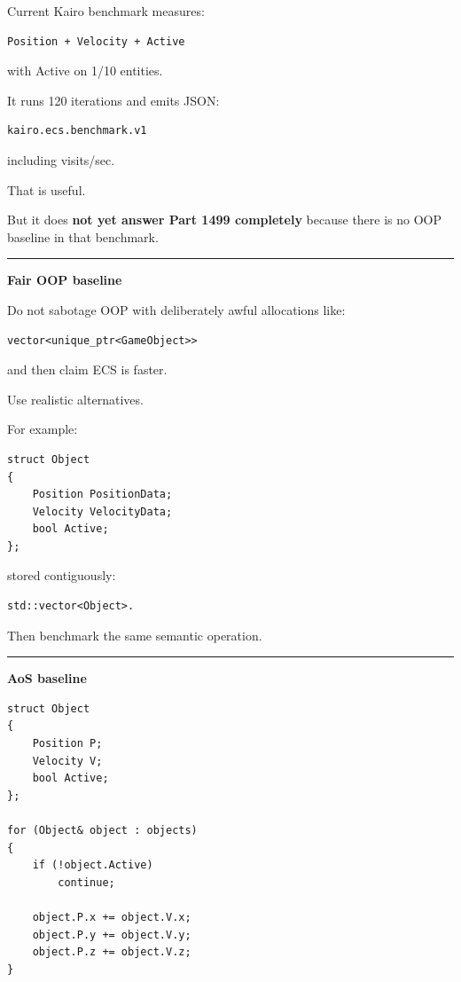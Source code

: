 Current Kairo benchmark measures:

\begin{verbatim}
Position + Velocity + Active
\end{verbatim}

with Active on 1/10 entities.

It runs 120 iterations and emits JSON:

\begin{verbatim}
kairo.ecs.benchmark.v1
\end{verbatim}

including visits/sec.

That is useful.

But it does \textbf{not yet answer Part 1499 completely} because there is no OOP baseline in that benchmark.

\begin{center}\rule{0.5\linewidth}{0.5pt}\end{center}

\textbf{Fair OOP baseline}

Do not sabotage OOP with deliberately awful allocations like:

\begin{verbatim}
vector<unique_ptr<GameObject>>
\end{verbatim}

and then claim ECS is faster.

Use realistic alternatives.

For example:

\begin{verbatim}
struct Object
{
    Position PositionData;
    Velocity VelocityData;
    bool Active;
};
\end{verbatim}

stored contiguously:

\begin{verbatim}
std::vector<Object>.
\end{verbatim}

Then benchmark the same semantic operation.

\begin{center}\rule{0.5\linewidth}{0.5pt}\end{center}

\textbf{AoS baseline}

\begin{verbatim}
struct Object
{
    Position P;
    Velocity V;
    bool Active;
};

for (Object& object : objects)
{
    if (!object.Active)
        continue;

    object.P.x += object.V.x;
    object.P.y += object.V.y;
    object.P.z += object.V.z;
}
\end{verbatim}


